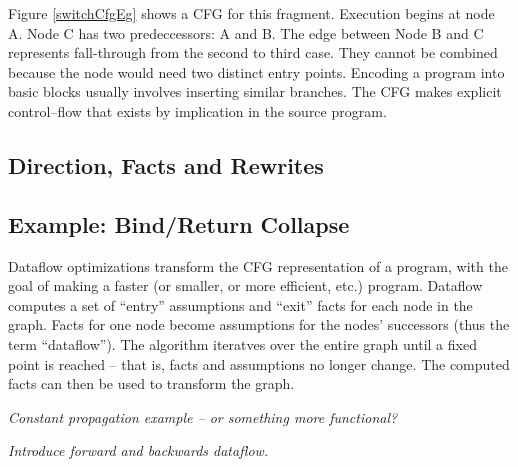 \documentclass[12pt]{report}
\begin{document}
Figure \ref{switchCfgEg} shows a CFG for this fragment. Execution
begins at node A. Node C has two predeccessors: A and B. The edge
between Node B and C represents fall-through from the second to third
case. They cannot be combined because the node would need two distinct
entry points. Encoding a program into basic blocks usually involves
inserting similar branches. The CFG makes explicit control--flow that
exists by implication in the source program.

\subsection{Direction, Facts and Rewrites}

\subsection{Example: Bind/Return Collapse}

Dataflow optimizations transform the CFG representation of a program,
with the goal of making a faster (or smaller, or more efficient, etc.)
program. Dataflow computes a set of ``entry'' assumptions and ``exit''
facts for each node in the graph. Facts for one node become
assumptions for the nodes' successors (thus the term
``dataflow''). The algorithm iteratves over the entire graph until a
fixed point is reached -- that is, facts and assumptions no longer
change. The computed facts can then be used to transform the graph.

\emph{Constant propagation example -- or something more functional?}

\emph{Introduce forward and backwards dataflow.}



\end{document}
